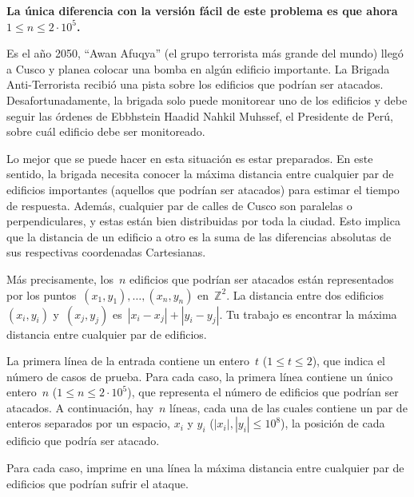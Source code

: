 
\textbf{La única diferencia con la versión fácil de este problema es que ahora~$1 \leq n \leq 2 \cdot 10^5$.}

Es el año 2050, ``Awan Afuqya'' (el grupo terrorista más grande del mundo) llegó a
Cusco y planea colocar una bomba en algún edificio importante. La Brigada
Anti-Terrorista recibió una pista sobre los edificios que podrían ser
atacados. Desafortunadamente, la brigada solo puede monitorear uno de los edificios y
debe seguir las órdenes de Ebbhstein Haadid Nahkil Muhssef, el Presidente de Perú,
sobre cuál edificio debe ser monitoreado.

Lo mejor que se puede hacer en esta situación es estar preparados. En este sentido,
la brigada necesita conocer la máxima distancia entre cualquier par de edificios
importantes (aquellos que podrían ser atacados) para estimar el tiempo de
respuesta. Además, cualquier par de calles de Cusco son paralelas o perpendiculares,
y estas están bien distribuidas por toda la ciudad. Esto implica que la distancia de
un edificio a otro es la suma de las diferencias absolutas de sus respectivas
coordenadas Cartesianas.

Más precisamente, los~$n$ edificios que podrían ser atacados están representados por
los puntos~$(x_1, y_1), \dots, (x_n, y_n)$ en~$\mathbb{Z}^2$. La distancia entre dos
edificios~$(x_i, y_i)$ y~$(x_j, y_j)$ es~$|x_i - x_j| + |y_i - y_j|$. Tu trabajo es
encontrar la máxima distancia entre cualquier par de edificios.


La primera línea de la entrada contiene un entero~$t$ ($1 \leq t \leq 2$), que indica
el número de casos de prueba. Para cada caso, la primera línea contiene un único
entero~$n$ ($1 \leq n \leq 2 \cdot 10^5$), que representa el número de edificios que
podrían ser atacados. A continuación, hay~$n$ líneas, cada una de las cuales contiene
un par de enteros separados por un espacio, $x_i$ y $y_i$ ($|x_i|, |y_i| \leq 10^8$),
la posición de cada edificio que podría ser atacado.

\outputText

Para cada caso, imprime en una línea la máxima distancia entre cualquier par de
edificios que podrían sufrir el ataque.

\exampleCases

\begin{example}
\end{example}

